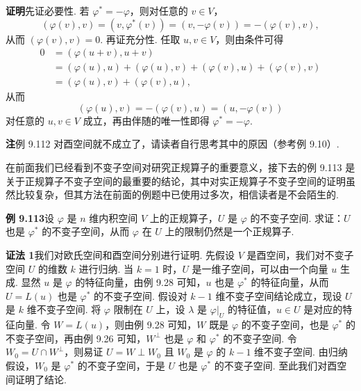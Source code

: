 \documentclass[UTF8,12pt,a4paper,fontset=fandol]{ctexart}
\begin{document}
\noindent\textbf{证明}\quad 先证必要性. 若 $\varphi^*=-\varphi$，则对任意的 $v\in V$，
\[
(\varphi(v),v)=(v,\varphi^*(v))=(v,-\varphi(v))=-(\varphi(v),v),
\]
从而 $(\varphi(v),v)=0$. 再证充分性. 任取 $u,v\in V$，则由条件可得
\[
\begin{aligned}
0&=(\varphi(u+v),u+v)\\
&=(\varphi(u),u)+(\varphi(u),v)+(\varphi(v),u)+(\varphi(v),v)\\
&=(\varphi(u),v)+(\varphi(v),u),
\end{aligned}
\]
从而
\[
(\varphi(u),v)=-(\varphi(v),u)=(u,-\varphi(v))
\]
对任意的 $u,v\in V$ 成立，再由伴随的唯一性即得 $\varphi^*=-\varphi$.

\noindent\textbf{注}\quad 例 9.112 对酉空间就不成立了，请读者自行思考其中的原因（参考例 9.10）.

在前面我们已经看到不变子空间对研究正规算子的重要意义，接下去的例 9.113 是关于正规算子不变子空间的最重要的结论，其中对实正规算子不变子空间的证明虽然比较复杂，但其方法在前面的例题中已使用过多次，相信读者是不会陌生的.

\noindent\textbf{例 9.113}\quad 设 $\varphi$ 是 $n$ 维内积空间 $V$ 上的正规算子，$U$ 是 $\varphi$ 的不变子空间. 求证：$U$ 也是 $\varphi^*$ 的不变子空间，从而 $\varphi$ 在 $U$ 上的限制仍然是一个正规算子.

\noindent\textbf{证法 1}\quad 我们对欧氏空间和酉空间分别进行证明. 先假设 $V$ 是酉空间，我们对不变子空间 $U$ 的维数 $k$ 进行归纳. 当 $k=1$ 时，$U$ 是一维子空间，可以由一个向量 $u$ 生成. 显然 $u$ 是 $\varphi$ 的特征向量，由例 9.28 可知，$u$ 也是 $\varphi^*$ 的特征向量，从而 $U=L(u)$ 也是 $\varphi^*$ 的不变子空间. 假设对 $k-1$ 维不变子空间结论成立，现设 $U$ 是 $k$ 维不变子空间. 将 $\varphi$ 限制在 $U$ 上，设 $\lambda$ 是 $\varphi|_U$ 的特征值，$u\in U$ 是对应的特征向量. 令 $W=L(u)$，则由例 9.28 可知，$W$ 既是 $\varphi$ 的不变子空间，也是 $\varphi^*$ 的不变子空间，再由例 9.26 可知，$W^\perp$ 也是 $\varphi$ 和 $\varphi^*$ 的不变子空间. 令 $W_0=U\cap W^\perp$，则易证 $U=W\perp W_0$ 且 $W_0$ 是 $\varphi$ 的 $k-1$ 维不变子空间. 由归纳假设，$W_0$ 是 $\varphi^*$ 的不变子空间，于是 $U$ 也是 $\varphi^*$ 的不变子空间. 至此我们对酉空间证明了结论.
\end{document}
